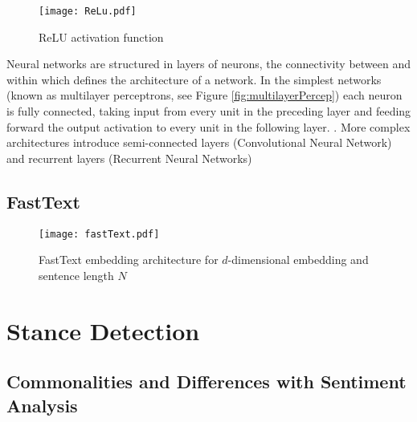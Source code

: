\documentclass[Dissertation.tex]{subfiles}
\begin{document}
\begin{figure}
	\centering
	\texttt{[image: ReLu.pdf]}

	\caption{ReLU activation function}
	\label{fig:ReLU}

\end{figure}

Neural networks are structured in layers of neurons, the connectivity between and within which defines the architecture of a network. In the simplest networks (known as multilayer perceptrons, see Figure \ref{fig:multilayerPercep}) each neuron is fully connected, taking input from every unit in the preceding layer and feeding forward the output activation to every unit in the following layer. \cite{pattersonDeepLearningPractitioner2017}. More complex architectures introduce semi-connected layers (Convolutional Neural Network) and recurrent layers (Recurrent Neural Networks)\cite{pattersonDeepLearningPractitioner2017}

\cite{jurafskySpeechLanguageProcessing}


\subsection{FastText}
\begin{figure}
	\texttt{[image: fastText.pdf]}
	\caption{FastText embedding architecture for $ d $-dimensional embedding and sentence length $ N $}
\end{figure}
\section{Stance Detection}\label{stanceDetection}
	
\subsection{Commonalities and Differences with Sentiment Analysis}
\end{document}
